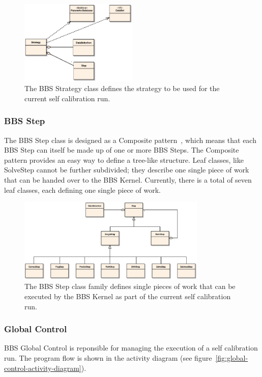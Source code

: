 \documentclass[10pt]{lofar}
\begin{document}
\begin{figure}[!ht]
\centering
\includegraphics[width=0.5\textwidth]{images/bbs-strategy-class-diagram}
\caption{The BBS Strategy class defines the strategy to be used for the
current self calibration run.}
\label{fig:bbsstrategy}
\end{figure}

\subsubsection{BBS Step}
\label{subsubsec:design-step}
The BBS Step class is designed as a Composite pattern~\cite{Gamma1995}, which
means that each BBS Step can itself be made up of one or more BBS Steps. The
Composite pattern provides an easy way to define a tree-like structure. Leaf
classes, like SolveStep cannot be further subdivided; they describe one single
piece of work that can be handed over to the BBS Kernel. Currently, there is a
total of seven leaf classes, each defining one single piece of work.

\begin{figure}[!ht]
\centering
\includegraphics[width=0.8\textwidth]{images/bbs-step-class-diagram}
\caption{The BBS Step class family defines single pieces of work that can be
executed by the BBS Kernel as part of the current self calibration run.}
\label{fig:bbsstep}
\end{figure}

\subsubsection{Global Control} \label{subsubsec:design-global-control} BBS
Global Control is reponsible for managing the execution of a self calibration
run. The program flow is shown in the activity diagram (see
figure~\ref{fig:global-control-activity-diagram}).
\end{document}
